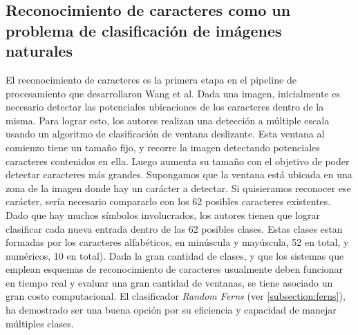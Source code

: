 \subsection{Reconocimiento de caracteres como un problema de clasificación de imágenes naturales}
\label{subsection: wang_recon_caracteres}
	
	El reconocimiento de caracteres es la primera etapa en el pipeline de procesamiento que desarrollaron Wang et al. Dada una imagen, inicialmente es necesario detectar las potenciales ubicaciones de los caracteres dentro de la misma. Para lograr esto, los autores realizan una detección a múltiple escala usando un algoritmo de clasificación de ventana deslizante. Esta ventana al comienzo tiene un tamaño fijo, y  recorre la imagen detectando potenciales caracteres contenidos en ella. Luego aumenta su tamaño con el objetivo de poder detectar caracteres más grandes. Supongamos que la ventana está ubicada en una zona de la imagen donde hay un carácter a detectar. Si quisieramos reconocer ese carácter, sería necesario compararlo con los 62 posibles caracteres existentes. Dado que hay muchos símbolos involucrados, los autores tienen que lograr clasificar cada nueva entrada dentro de las 62 posibles clases. Estas clases estan formadas por los caracteres alfabéticos, en minúscula y mayúscula, 52 en total, y numéricos, 10 en total). Dada la gran cantidad de clases, y que los sistemas que emplean esquemas de reconocimiento de caracteres usualmente deben funcionar en tiempo real y evaluar una gran cantidad de ventanas, se tiene asociado un gran costo computacional. El clasificador \textit{Random Ferns} (ver \ref{subsection:ferns}), ha demostrado ser una buena opción por su eficiencia y capacidad de manejar múltiples clases.
	
	
